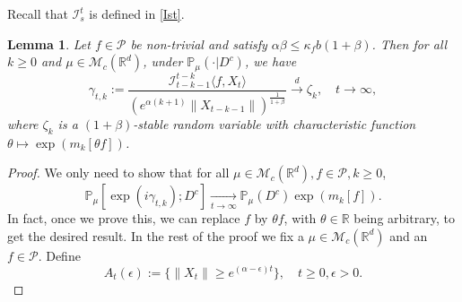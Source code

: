 \documentclass[12pt,a4paper]{amsart}
\theoremstyle{plain}
\newtheorem{lem}[thm]{Lemma}
\theoremstyle{definition}
\numberwithin{equation}{section}
\begin{document}
Recall that $\mathcal I_s^t$ is defined in \eqref{Ist}.
\begin{lem}
  \label{lem: mainlemma}
  Let $f\in \mathcal{P}$ be non-trivial and satisfy $\alpha\beta\leq \kappa_fb(1+\beta)$.
  Then for all $k\geq 0$ and $\mu \in \mathcal M_c(\mathbb R^d)$, under $\mathbb{P}_{\mu}(\cdot | D ^c)$, we have
\begin{equation}
    \gamma_{t,k}
    := \frac{\mathcal I_{t-k-1}^{t-k}\langle f ,X_t\rangle}{(e^{\alpha (k+1)}\|X_{t-k-1}\|)^{\frac{1}{1+\beta}}}\xrightarrow{d}\zeta_k, \quad t\rightarrow \infty, \label{limitdistribution1}
\end{equation}
where $\zeta_k$ is a $(1+\beta)$-stable random variable with characteristic function $\theta\mapsto \exp(m_k[\theta f])$.
\end{lem}
\begin{proof}
  We only need to show that for all $\mu \in \mathcal M_c(\mathbb R^d), f\in \mathcal P, k \geq 0$,
\begin{equation}
  \mathbb{P}_{\mu}[\exp(i\gamma_{t,k}); D^c]
  \xrightarrow[t\rightarrow \infty]{}\mathbb{P}_{\mu}(D^c)\exp(m_k[f]).
\end{equation}
In fact, once we prove this, we can replace $f$ by $\theta f$, with $\theta \in \mathbb R$ being  arbitrary,  to get the desired result.
In the rest of the proof we fix a $\mu \in \mathcal M_c(\mathbb R^d)$ and an $f\in \mathcal P$.
Define
\[
  A_t(\epsilon)
  :=\{ \|X_t\| \geq e^{(\alpha - \epsilon)t} \},
  \quad t\geq 0, \epsilon > 0.
\]


\end{proof}
\end{document}
